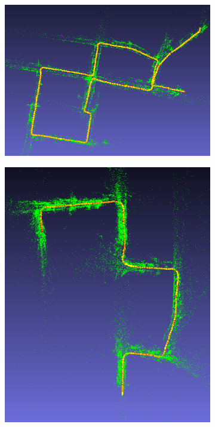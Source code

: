 \documentclass{article}
\begin{document}
\begin{figure}[h]
    \centering
    \begin{subfigure}[b]{.30\textwidth}
        \includegraphics[width=\linewidth]{./vo_stereo_2.png}
        \caption{}
    \end{subfigure}
    \begin{subfigure}[b]{.30\textwidth}
        \includegraphics[width=\linewidth]{./vo_mono_3.png}

\end{subfigure}
\end{figure}
\end{document}
